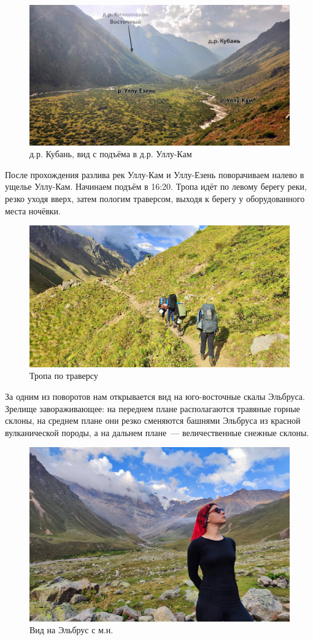 \begin{figure}[h!]
	\centering
	\includegraphics[width=0.7\linewidth]{../pics/DSC_0464 2.JPG}
	\caption{д.р. Кубань, вид с подъёма в д.р. Уллу-Кам}
	\label{fig:DSC_0464 2.JPG}
\end{figure}

После прохождения разлива рек Уллу-Кам и Уллу-Езень поворачиваем налево в ущелье Уллу-Кам. Начинаем подъём в 16:20. Тропа идёт по левому берегу реки, резко уходя вверх, затем пологим траверсом, выходя к берегу у оборудованного места ночёвки.


\begin{figure}[h!]
	\centering
	\includegraphics[width=0.7\linewidth]{../pics/IMG_20240829_170756.jpg}
	\caption{Тропа по траверсу}
	\label{fig:IMG_20240829_170756.jpg}
\end{figure}

За одним из поворотов нам открывается вид на юго-восточные скалы Эльбруса. Зрелище завораживающее: на переднем плане располагаются травяные горные склоны, на среднем плане они резко сменяются башнями Эльбруса из красной вулканической породы, а на дальнем плане~--- величественные снежные склоны.

\begin{figure}[h!]
	\centering
	\includegraphics[width=0.7\linewidth]{../pics/IMG_20240829_181353.jpg}
	\caption{Вид на Эльбрус с м.н.}
	\label{fig:IMG_20240829_184033}
\end{figure}



